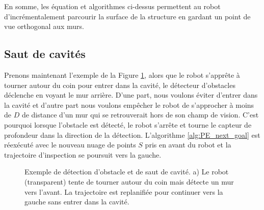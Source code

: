 En somme, les équation et algorithmes ci-dessus permettent au robot d'incrémentalement parcourir la surface de la structure en gardant un point de vue orthogonal aux murs.

\subsection{Saut de cavités}
\label{subsec:ugv_cavity_skip}

Prenons maintenant l'exemple de la Figure \ref{fig:ugv_exploration}, alors que le robot s'apprête à tourner autour du coin pour entrer dans la cavité, le détecteur d'obstacles déclenche en voyant le mur arrière. D'une part, nous voulons éviter d'entrer dans la cavité et d'autre part nous voulons empêcher le robot de s'approcher à moins de $D$ de distance d'un mur qui se retrouverait hors de son champ de vision. C'est pourquoi lorsque l'obstacle est détecté, le robot s'arrête et tourne le capteur de profondeur dans la direction de la détection. L'algorithme \ref{alg:PE_next_goal} est réexécuté avec le nouveau nuage de points $S$ pris en avant du robot et la trajectoire d'inspection se poursuit vers la gauche.

\begin{figure}[ht]
\centering
{}
\hfil
{}
\caption{
Exemple de détection d'obstacle et de saut de cavité. a) Le robot (transparent) tente de tourner autour du coin mais détecte un mur vers l'avant. La trajectoire est replanifiée pour continuer vers la gauche sans entrer dans la cavité.}
\label{fig:ugv_exploration}
\end{figure}

